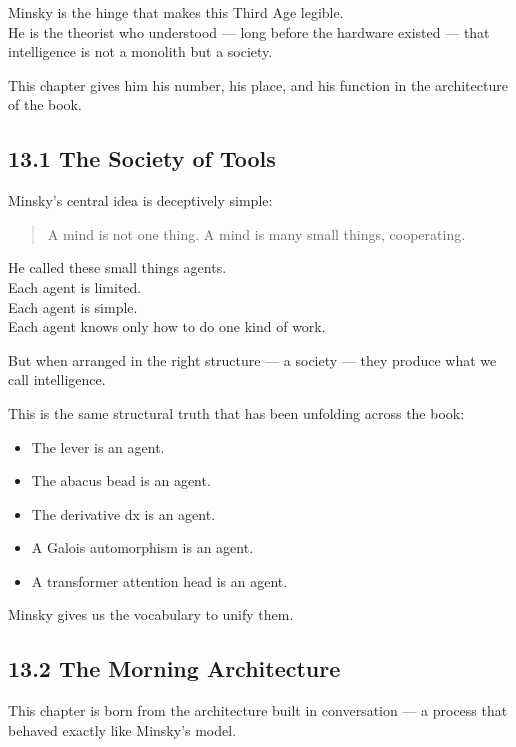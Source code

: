 Minsky is the hinge that makes this Third Age legible.\\
He is the theorist who understood --- long before the hardware existed
--- that intelligence is not a monolith but a society.

This chapter gives him his number, his place, and his function in the
architecture of the book.

\hypertarget{the-society-of-tools}{%
\subsection{13.1 The Society of Tools}\label{the-society-of-tools}}

Minsky's central idea is deceptively simple:

\begin{quote}
A mind is not one thing. A mind is many small things, cooperating.
\end{quote}

He called these small things agents.\\
Each agent is limited.\\
Each agent is simple.\\
Each agent knows only how to do one kind of work.

But when arranged in the right structure --- a society --- they produce
what we call intelligence.

This is the same structural truth that has been unfolding across the
book:

\begin{itemize}
\tightlist
\item
  The lever is an agent.
\item
  The abacus bead is an agent.
\item
  The derivative dx is an agent.
\item
  A Galois automorphism is an agent.
\item
  A transformer attention head is an agent.
\end{itemize}

Minsky gives us the vocabulary to unify them.

\hypertarget{the-morning-architecture}{%
\subsection{13.2 The Morning
Architecture}\label{the-morning-architecture}}

This chapter is born from the architecture built in conversation --- a
process that behaved exactly like Minsky's model.

